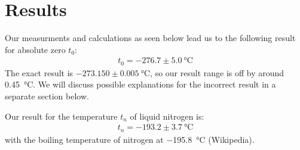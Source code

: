 \section{Results}

Our measurments and calculations as seen below lead us to the following result for absolute zero $t_0$:
\begin{align}
	t_0 = -276.7 \pm \SI{5.0}{\degreeCelsius} 
\end{align}
The exact result is $-273.150 \pm \SI{0.005}{\degreeCelsius}$, so our result range is off by around \SI{0.45}{\degreeCelsius}. We will discuss possible explanations for the incorrect result in a separate section below. 


Our result for the temperature $t_n$ of liquid nitrogen is:
\begin{align}
	t_n = -193.2 \pm \SI{3.7}{\degreeCelsius} 
\end{align}
with the boiling temperature of nitrogen at \SI{-195.8}{\degreeCelsius} (Wikipedia).
